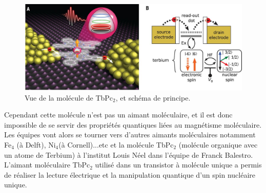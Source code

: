 \begin{figure}[h]
    \begin{center}
        \includegraphics{Images/1_TbPc2.jpg}
        \caption{Vue de la molécule de TbPc$_2$, et schéma de principe.}
    \end{center}
\end{figure}

Cependant cette molécule n'est pas un aimant moléculaire, et il est donc impossible de se servir des propriétés quantiques liées au magnétisme moléculaire. Les équipes vont alors se tourner vers d'autres aimants moléculaires notamment Fe$_{4}$ (à Delft), Ni$_{4}$(à Cornell)...etc et la molécule TbPc$_{2}$ (molécule organique avec un atome de Terbium) à l'institut Louis Néel dans l'équipe de Franck Balestro. L'aimant moléculaire TbPc$_{2}$ utilisé dans un transistor à molécule unique a permis de réaliser la lecture électrique et la manipulation quantique d'un spin nucléaire unique.
